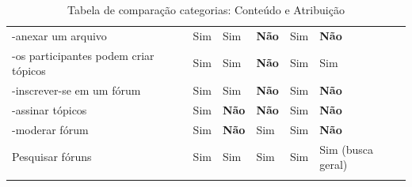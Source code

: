 \begin{landscape}
\begin{table}[H]
\begin{tiny}
\begin{tabular}{C{4cm}C{3.2cm}C{3.2cm}C{3.2cm}C{3.2cm}C{3.2cm}}
	-anexar um arquivo& Sim & Sim & \textbf{Não}& Sim   & \textbf{Não}    \\
	-os participantes podem criar tópicos   & Sim & Sim & \textbf{Não}& Sim   & Sim    \\
	-inscrever-se em um fórum  & Sim & Sim & \textbf{Não}& Sim   & \textbf{Não}    \\
	-assinar tópicos& Sim & \textbf{Não} & \textbf{Não}& Sim   & \textbf{Não}     \\
	-moderar fórum& Sim & \textbf{Não}  & Sim& Sim   & \textbf{Não}     \\
	Pesquisar fóruns& Sim & Sim & Sim& Sim   & Sim {\tiny (busca geral)} \\
	 & & & & & \\
	\bottomrule
	\end{tabular}
	\end{tiny}
	\caption{Tabela de comparação categorias: Conteúdo e Atribuição}
	\label{tab:conteudo-atribuicao}
\end{table}


\end{landscape}
